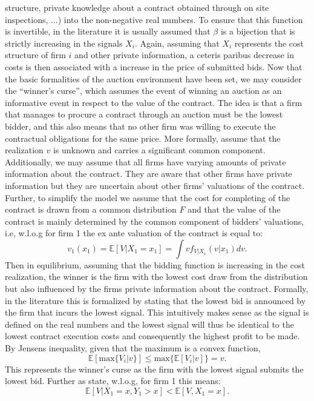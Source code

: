 \documentclass[a4paper,12pt, headsepline]{scrartcl}
\numberwithin{equation}{section}
\begin{document}
structure, private knowledge about a contract obtained through on site inspections, ...) into the non-negative real numbers. To ensure that this function is invertible, in the literature it is usually assumed that $\beta$ is a bijection that is strictly increasing in the signals $X_i$. Again, assuming that $X_i$ represents the cost structure of firm $i$ and other private information, a ceteris paribus decrease in costs is then associated with a increase in the price of submitted bids. Now that the basic formalities of the auction environment have been set, we may consider the \enquote{winner's curse}, which assumes the event of winning an auction as an informative event in respect to the value of the contract. The idea is that a firm that manages to procure a contract through an auction must be the lowest bidder, and this also means that no other firm was willing to execute the contractual obligations for the same price. More formally, assume that the realization $v$ is unknown and carries a significant common component. Additionally, we may assume that all firms have varying amounts of private information about the contract. They are aware that other firms have private information but they are uncertain about other firms' valuations of the contract. Further, to simplify the model we assume that the cost for completing of the contract is drawn from a common distribution $F$ and that the value of the contract is mainly determined by the common component of bidders' valuations, i.e, w.l.o.g for firm 1 the ex ante valuation of the contract is equal to:
\[
v_1(x_1) = \mathbb{E}[V|X_1 = x_1]  = \int vf_{V|X_1}(v|x_1)dv.
\]
 Then in equilibrium, assuming that the bidding function is increasing in the cost realization, the winner is the firm with the lowest cost draw from the distribution but also influenced by the firms private information about the contract. Formally, in the literature this is formalized by stating that the lowest bid is announced by the firm that incurs the lowest signal. This intuitively makes sense as the signal is defined on the real numbers and the lowest signal will thus be identical to the lowest contract execution costs and consequently the highest profit to be made. By Jensens inequality, given that the maximum is a convex function, 
\[
\mathbb{E}[\text{max}\{V_i|v\}] \leq \text{max}\{{\mathbb{E}[V_i|v]}\} = v.
\] 
This represents the winner's curse as the firm with the lowest signal submits the lowest bid. Further as \citet{milgrom82} state, w.l.o.g, for firm 1 this means:
\[
\mathbb{E}[V|X_1 = x, Y_1 > x] < \mathbb{E}[V, X_1 = x].
\]
\end{document}
